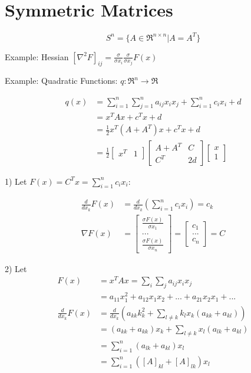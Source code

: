 \section{Symmetric Matrices}

\begin{equation*}
S^n = \{A\in \Re^{n\times n} | A = A^T \}
\end{equation*}

Example: Hessian $[\nabla^2 F]_{ij} = \frac{\sigma}{\sigma x_i}\frac{\sigma}{\sigma x_j}F(x)$


Example: Quadratic Functions: $q: \Re^n \rightarrow \Re$

\begin{align*}
q(x) &= \sum^n_{i=1}\sum^n_{j=1}a_{ij}x_ix_j + \sum^n_{i=1}c_ix_i + d\\
&= x^TAx + c^Tx + d\\
&= \frac{1}{2}x^T(A + A^T)x + c^Tx + d\\
&= \frac{1}{2}
\begin{bmatrix}%
x^T& 1
\end{bmatrix}
\begin{bmatrix}%
A + A^T & C\\
C^T & 2d
\end{bmatrix}
\begin{bmatrix}%
x\\
1
\end{bmatrix}
\end{align*}


1) Let $F(x) = C^Tx = \sum^n_{i=1}c_ix_i$:

\begin{align*}
\frac{d}{dx_k}F(x) &= \frac{d}{dx_k}(\sum^n_{i=1}c_ix_i) = c_k\\
\nabla F(x) &= 
\begin{bmatrix}%
\frac{\sigma F(x)}{\sigma x_1}\\
...\\
\frac{\sigma F(x)}{\sigma x_n}
\end{bmatrix}=
\begin{bmatrix}%
c_1\\
...\\
c_n
\end{bmatrix} = C
\end{align*}

2) Let
\begin{align*}
F(x) &= x^TAx = \sum_i\sum_ja_{ij}x_ix_j\\
&= a_{11}x_1^2 + a_{12}x_1x_2 + ... + a_{21}x_2x_1 + ...\\
\frac{d}{dx_k}F(x) &= \frac{d}{dx_k}(a_{kk}k_k^2 + \sum_{l\neq k}k_lx_k(a_{kk}+a_{kl}))\\
&= (a_{kk} + a_{kk})x_k + \sum_{l\neq k}x_l(a_{lk} + a_{kl}) \\
&= \sum^n_{i=1}(a_{lk} + a_{kl})x_l\\
&= \sum^n_{i=1}([A]_{kl} + [A]_{lk})x_l
\end{align*}

